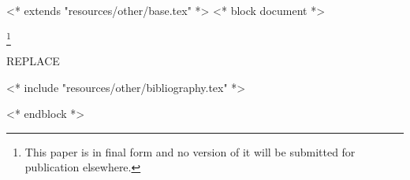 <* extends "resources/other/base.tex" *>
<* block document *>
\subjclass[2010]{\docclasses}
\keywords{\dockeywords}



\title[\shorttitlename]{\titlename}
\author{<+ user.name +>}
\address{<+ user.institution +>, <+ user.address +>}
\thanks{This paper is in final form and no version of it will be submitted for publication elsewhere.}

\begin{abstract}
    REPLACE
\end{abstract}

\maketitle
\tableofcontents

REPLACE

<* include "resources/other/bibliography.tex" *>


<* endblock *>
